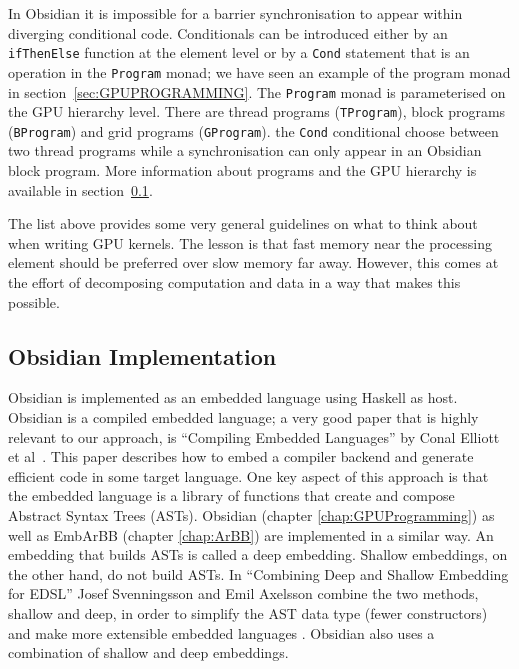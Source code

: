 \documentclass[a4paper]{book}
\begin{document}
\begin{itemize}
In Obsidian it is impossible for a barrier synchronisation to appear within diverging 
conditional code. Conditionals can be introduced either by an \\{\tt ifThenElse} function 
at the element level or by a {\tt Cond} statement that is an operation in the {\tt Program} 
monad; we have seen an example of the program monad in section~\ref{sec:GPUPROGRAMMING}. 
The {\tt Program} monad is parameterised on the GPU hierarchy level. There are 
thread programs ({\tt TProgram}), block programs ({\tt BProgram}) and grid programs 
({\tt GProgram}). the {\tt Cond} conditional choose between two thread programs while a 
synchronisation can only appear in an Obsidian block program. More information about programs 
and the GPU hierarchy is available in section~\ref{sec:OBSIMP}.

\end{itemize}  

The list above provides some very general guidelines on what to think about when 
writing GPU kernels. The lesson is that fast memory near the processing element 
should be preferred over slow memory far away. However, this comes at the effort 
of decomposing computation and data in a way that makes this possible. 

%
%
\subsection{Obsidian Implementation}
\label{sec:OBSIMP}

Obsidian is implemented as an embedded language using Haskell as host. Obsidian 
is a compiled embedded language; a very good paper that is highly relevant to our 
approach, is ``Compiling Embedded Languages'' by Conal Elliott et al~\citet{COMPILEEDSL}. 
This paper describes how to embed a compiler backend and generate efficient code 
in some target language. One key aspect of this approach is that the embedded 
language is a library of functions that create and compose Abstract Syntax Trees 
(ASTs). Obsidian (chapter \ref{chap:GPUProgramming}) as well as EmbArBB 
(chapter \ref{chap:ArBB}) are implemented in a similar way. An embedding that builds 
ASTs is called a deep embedding. Shallow embeddings, on the other hand, do not build 
ASTs. In ``Combining Deep and Shallow Embedding for EDSL'' Josef Svenningsson and 
Emil Axelsson combine the two methods, shallow and deep, in order to simplify the 
AST data type (fewer constructors) and make more extensible embedded languages 
\citet{DEEPSHALLOW}. Obsidian also uses a combination of shallow 
and deep embeddings. 
\end{document}
